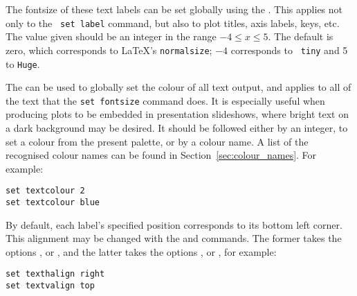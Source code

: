  The fontsize of these text labels can be set
globally using the . This applies not only to the {\tt
set label} command, but also to plot titles, axis labels, keys, etc. The value
given should be an integer in the range $-4 \leq x \leq 5$. The default is
zero, which corresponds to \LaTeX's {\tt normalsize}; $-4$ corresponds to {\tt
tiny} and 5 to {\tt Huge}.

 The  can be
used to globally set the colour of all text output, and applies to all of the
text that the {\tt set fontsize} command does. It is especially useful when
producing plots to be embedded in presentation slideshows, where bright text on
a dark background may be desired. It should be followed either by an integer,
to set a colour from the present palette, or by a colour name. A list of the
recognised colour names can be found in Section~\ref{sec:colour_names}.  For
example:

\begin{verbatim}
set textcolour 2
set textcolour blue
\end{verbatim}

By default, each label's specified
position corresponds to its bottom left corner. This alignment may be changed
with the  and  commands. The
former takes the options ,  or ,
and the latter takes the options ,  or
, for example:

\begin{verbatim}
set texthalign right
set textvalign top
\end{verbatim}

